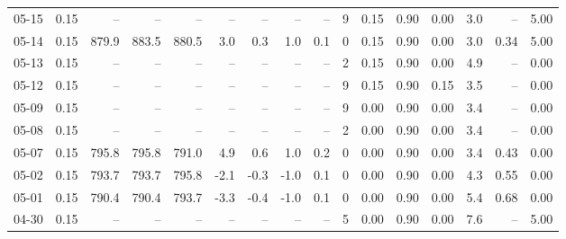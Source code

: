 \begin{threeparttable}
{\begin{tabular}{lrrrrrrrrrrrrrrr}
  05-15 &     0.15 &    -- &    -- &    -- &         -- &             -- &                       -- &                  -- &              9 &       0.15 &      0.90 &           0.00 &              3.0 &              -- &                   5.00 \\
  05-14 &     0.15 & 879.9 & 883.5 & 880.5 &        3.0 &            0.3 &                      1.0 &                 0.1 &              0 &       0.15 &      0.90 &           0.00 &              3.0 &            0.34 &                   5.00 \\
  05-13 &     0.15 &    -- &    -- &    -- &         -- &             -- &                       -- &                  -- &              2 &       0.15 &      0.90 &           0.00 &              4.9 &              -- &                   0.00 \\
  05-12 &     0.15 &    -- &    -- &    -- &         -- &             -- &                       -- &                  -- &              9 &       0.15 &      0.90 &           0.15 &              3.5 &              -- &                   0.00 \\
  05-09 &     0.15 &    -- &    -- &    -- &         -- &             -- &                       -- &                  -- &              9 &       0.00 &      0.90 &           0.00 &              3.4 &              -- &                   0.00 \\
  05-08 &     0.15 &    -- &    -- &    -- &         -- &             -- &                       -- &                  -- &              2 &       0.00 &      0.90 &           0.00 &              3.4 &              -- &                   0.00 \\
  05-07 &     0.15 & 795.8 & 795.8 & 791.0 &        4.9 &            0.6 &                      1.0 &                 0.2 &              0 &       0.00 &      0.90 &           0.00 &              3.4 &            0.43 &                   0.00 \\
  05-02 &     0.15 & 793.7 & 793.7 & 795.8 &       -2.1 &           -0.3 &                     -1.0 &                 0.1 &              0 &       0.00 &      0.90 &           0.00 &              4.3 &            0.55 &                   0.00 \\
  05-01 &     0.15 & 790.4 & 790.4 & 793.7 &       -3.3 &           -0.4 &                     -1.0 &                 0.1 &              0 &       0.00 &      0.90 &           0.00 &              5.4 &            0.68 &                   0.00 \\
  04-30 &     0.15 &    -- &    -- &    -- &         -- &             -- &                       -- &                  -- &              5 &       0.00 &      0.90 &           0.00 &              7.6 &              -- &                   5.00 \\

\end{tabular}}
\end{threeparttable}

